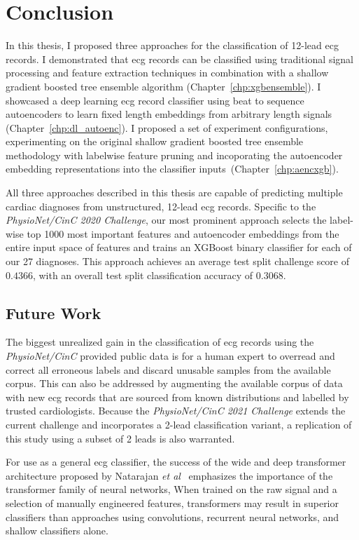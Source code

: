 \documentclass[\main/thesis.tex]{subfiles}
\begin{document}
\chapter{Conclusion}
\label{chp:conclusion}

In this thesis, I proposed three approaches for the classification of 12-lead \gls{ecg} records.
I demonstrated that \gls{ecg} records can be classified using traditional signal processing and feature extraction techniques in combination with a shallow gradient boosted tree ensemble algorithm (Chapter~\ref{chp:xgbensemble}).
I showcased a deep learning \gls{ecg} record classifier using beat to sequence autoencoders to learn fixed length embeddings from arbitrary length signals (Chapter~\ref{chp:dl_autoenc}).
I proposed a set of experiment configurations, experimenting on the original shallow gradient boosted tree ensemble methodology with labelwise feature pruning and incoporating the autoencoder embedding representations into the classifier inputs~(Chapter~\ref{chp:aencxgb}).

All three approaches described in this thesis are capable of predicting multiple cardiac diagnoses from unstructured, 12-lead \gls{ecg} records.
Specific to the \emph{PhysioNet/CinC 2020 Challenge}, our most prominent approach selects the label-wise top 1000 most important features and autoencoder embeddings from the entire input space of features and trains an XGBoost binary classifier for each of our 27 diagnoses.
This approach achieves an average test split challenge score of $0.4366$, with an overall test split classification accuracy of $0.3068$.

\section{Future Work}
The biggest unrealized gain in the classification of \gls{ecg} records using the \emph{PhysioNet/CinC} provided public data is for a human expert to overread and correct all erroneous labels and discard unusable samples from the available corpus.
This can also be addressed by augmenting the available corpus of data with new \gls{ecg} records that are sourced from known distributions and labelled by trusted cardiologists.
Because the \emph{PhysioNet/CinC 2021 Challenge} extends the current challenge and incorporates a 2-lead classification variant, a replication of this study using a subset of 2 leads is also warranted.

For use as a general \gls{ecg} classifier, the success of the wide and deep transformer architecture proposed by Natarajan \emph{et al}~\cite{natarajan2020CINC-multilabel-ECG} emphasizes the importance of the transformer family of neural networks,
When trained on the raw signal and a selection of manually engineered features, transformers may result in superior classifiers than approaches using convolutions, recurrent neural networks, and shallow classifiers alone.
\end{document}
